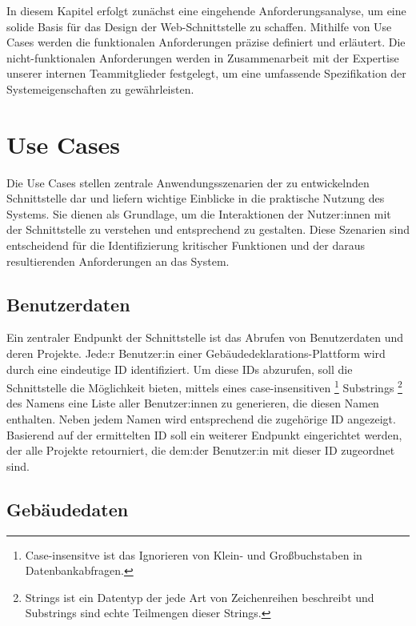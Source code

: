 \documentclass[draft,final]{vutinfth} %
\begin{document}
In diesem Kapitel erfolgt zunächst eine eingehende Anforderungsanalyse, um eine solide Basis für das Design der Web-Schnittstelle zu schaffen. 
Mithilfe von Use Cases werden die funktionalen Anforderungen präzise definiert und erläutert. 
Die nicht-funktionalen Anforderungen werden in Zusammenarbeit mit der Expertise unserer internen Teammitglieder festgelegt, um eine umfassende Spezifikation der Systemeigenschaften zu gewährleisten.


\section{Use Cases}
\label{sec:useCases}

Die Use Cases stellen zentrale Anwendungsszenarien der zu entwickelnden Schnittstelle dar und liefern wichtige Einblicke in die praktische Nutzung des Systems. 
Sie dienen als Grundlage, um die Interaktionen der Nutzer:innen mit der Schnittstelle zu verstehen und entsprechend zu gestalten. 
Diese Szenarien sind entscheidend für die Identifizierung kritischer Funktionen und der daraus resultierenden Anforderungen an das System.


\subsection{Benutzerdaten}

Ein zentraler Endpunkt der Schnittstelle ist das Abrufen von Benutzerdaten und deren Projekte. 
Jede:r Benutzer:in einer Gebäudedeklarations-Plattform wird durch eine eindeutige ID identifiziert. 
Um diese IDs abzurufen, soll die Schnittstelle die Möglichkeit bieten, mittels eines case-insensitiven 
\footnote{
	Case-insensitve ist das Ignorieren von Klein- und Großbuchstaben in Datenbankabfragen.
}
Substrings
\footnote{
	Strings ist ein Datentyp der jede Art von Zeichenreihen beschreibt und Substrings sind echte Teilmengen dieser Strings.
}
des Namens eine Liste aller Benutzer:innen zu generieren, die diesen Namen enthalten. Neben jedem Namen wird entsprechend die zugehörige ID angezeigt.
Basierend auf der ermittelten ID soll ein weiterer Endpunkt eingerichtet werden, der alle Projekte retourniert, die dem:der Benutzer:in mit dieser ID zugeordnet sind.


\subsection{Gebäudedaten}
\end{document}
